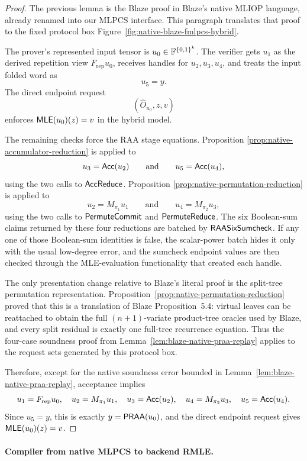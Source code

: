 \begin{proof}
The previous lemma is the Blaze proof in Blaze's native MLIOP language, already
renamed into our MLPCS interface.  This paragraph translates that proof to the
fixed protocol box
Figure~\ref{fig:native-blaze-fmlpcs-hybrid}.

The prover's represented input tensor is \(u_0\in\mathbb{F}^{\{0,1\}^k}\).  The verifier
gets \(u_1\) as the derived repetition view \(F_{\mathrm{rep}}u_0\), receives
handles for \(u_2,u_3,u_4\), and treats the input folded word as
\[
  u_5=y.
\]
The direct endpoint request
\[
  (\widehat O_{u_0},z,v)
\]
enforces \(\mathsf{MLE}(u_0)(z)=v\) in the hybrid model.

The remaining checks force the RAA stage equations.  Proposition
\ref{prop:native-accumulator-reduction} is applied to
\[
  u_3=\mathsf{Acc}(u_2)
  \qquad\text{and}\qquad
  u_5=\mathsf{Acc}(u_4),
\]
using the two calls to \(\mathsf{AccReduce}\).  Proposition
\ref{prop:native-permutation-reduction} is applied to
\[
  u_2=M_{\pi_1}u_1
  \qquad\text{and}\qquad
  u_4=M_{\pi_2}u_3,
\]
using the two calls to \(\mathsf{PermuteCommit}\) and \(\mathsf{PermuteReduce}\).  The six
Boolean-sum claims returned by these four reductions are batched by
\(\mathsf{RAASixSumcheck}\).  If any one of those Boolean-sum identities is false, the
scalar-power batch hides it only with the usual low-degree error, and the
sumcheck endpoint values are then checked through the MLE-evaluation
functionality that created each handle.

The only presentation change relative to Blaze's literal proof is the
split-tree permutation representation.  Proposition~\ref{prop:native-permutation-reduction}
proved that this is a translation of Blaze Proposition~5.4: virtual leaves can
be reattached to obtain the full \((n+1)\)-variate product-tree oracles used by
Blaze, and every split residual is exactly one full-tree recurrence equation.
Thus the four-case soundness proof from
Lemma~\ref{lem:blaze-native-praa-replay} applies to the request sets generated
by this protocol box.

Therefore, except for the native soundness error bounded in
Lemma~\ref{lem:blaze-native-praa-replay}, acceptance implies
\[
  u_1=F_{\mathrm{rep}}u_0,\quad
  u_2=M_{\pi_1}u_1,\quad
  u_3=\mathsf{Acc}(u_2),\quad
  u_4=M_{\pi_2}u_3,\quad
  u_5=\mathsf{Acc}(u_4).
\]
Since \(u_5=y\), this is exactly \(y=\mathsf{PRAA}(u_0)\), and the direct endpoint
request gives \(\mathsf{MLE}(u_0)(z)=v\).
\end{proof}

\paragraph{Compiler from native MLPCS to backend RMLE.}


